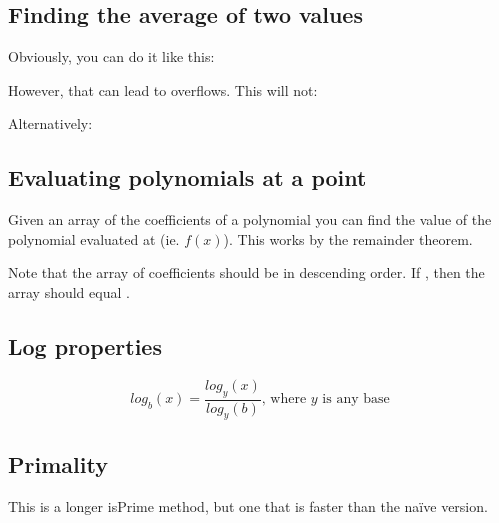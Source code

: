 \subsection*{Finding the average of two values}

Obviously, you can do it like this: 

However, that can lead to overflows. This will not: 

Alternatively: 

\subsection*{Evaluating polynomials at a point}

Given an array of the coefficients of a polynomial you can find the value of the polynomial evaluated at  (ie. $f(x)$). This works by the remainder theorem.



Note that the array of coefficients should be in descending order. If , then the array should equal .

\subsection*{Log properties}

$$log_b(x) = \frac{log_y(x)}{log_y(b)} \text{, where } y \text{ is any base}$$

\subsection*{Primality}

This is a longer isPrime method, but one that is faster than the naïve version.



\newpage
